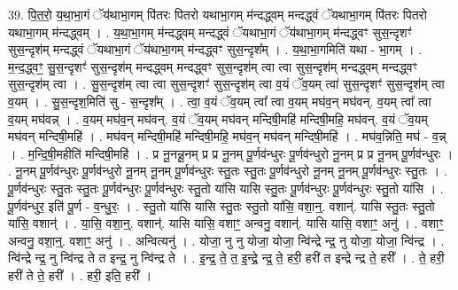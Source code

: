 \documentclass[17pt]{extarticle}
\begin{document}
39. पि॒त॒रो॒ य॒था॒भा॒गं ॅय॑थाभा॒गम् पि॑तरः पितरो यथाभा॒गम् म॑न्दद्ध्वम् मन्दद्ध्वं ॅयथाभा॒गम् पि॑तरः पितरो यथाभा॒गम् म॑न्दद्ध्वम् । . य॒था॒भा॒गम् म॑न्दद्ध्वम् मन्दद्ध्वं ॅयथाभा॒गं ॅय॑थाभा॒गम् म॑न्दद्ध्वꣳ सुस॒न्दृशꣳ॑ सुस॒न्दृश॑म् मन्दद्ध्वं ॅयथाभा॒गं ॅय॑थाभा॒गम् म॑न्दद्ध्वꣳ सुस॒न्दृश᳚म् । . य॒था॒भा॒गमिति॑ यथा - भा॒गम् । . म॒न्द॒द्ध्वꣳ॒॒ सु॒स॒न्दृशꣳ॑ सुस॒न्दृश॑म् मन्दद्ध्वम् मन्दद्ध्वꣳ सुस॒न्दृश॑म् त्वा त्वा सुस॒न्दृश॑म् मन्दद्ध्वम् मन्दद्ध्वꣳ सुस॒न्दृश॑म् त्वा । . सु॒स॒न्दृश॑म् त्वा त्वा सुस॒न्दृशꣳ॑ सुस॒न्दृश॑म् त्वा व॒यं ॅव॒यम् त्वा॑ सुस॒न्दृशꣳ॑ सुस॒न्दृश॑म् त्वा व॒यम् । . सु॒स॒न्दृश॒मिति॑ सु - स॒न्दृश᳚म् । . त्वा॒ व॒यं ॅव॒यम् त्वा᳚ त्वा व॒यम् मघ॑व॒न् मघ॑वन्. व॒यम् त्वा᳚ त्वा व॒यम् मघ॑वन्न् । . व॒यम् मघ॑व॒न् मघ॑वन्. व॒यं ॅव॒यम् मघ॑वन् मन्दिषी॒महि॑ मन्दिषी॒महि॒ मघ॑वन्. व॒यं ॅव॒यम् मघ॑वन् मन्दिषी॒महि॑ । . मघ॑वन् मन्दिषी॒महि॑ मन्दिषी॒महि॒ मघ॑व॒न् मघ॑वन् मन्दिषी॒महि॑ । . मघ॑व॒न्निति॒ मघ॑ - व॒न्न् । . म॒न्दि॒षी॒महीति॑ मन्दिषी॒महि॑ । . प्र नू॒नन्नू॒नम् प्र प्र नू॒नम् पू॒र्णव॑न्धुरः पू॒र्णव॑न्धुरो नू॒नम् प्र प्र नू॒नम् पू॒र्णव॑न्धुरः । . नू॒नम् पू॒र्णव॑न्धुरः पू॒र्णव॑न्धुरो नू॒नम् नू॒नम् पू॒र्णव॑न्धुरः स्तु॒तः स्तु॒तः पू॒र्णव॑न्धुरो नू॒नम् नू॒नम् पू॒र्णव॑न्धुरः स्तु॒तः । . पू॒र्णव॑न्धुरः स्तु॒तः स्तु॒तः पू॒र्णव॑न्धुरः पू॒र्णव॑न्धुरः स्तु॒तो या॑सि यासि स्तु॒तः पू॒र्णव॑न्धुरः पू॒र्णव॑न्धुरः स्तु॒तो या॑सि । . पू॒र्णव॑न्धुर॒ इति॑ पू॒र्ण - व॒न्धु॒रः॒ । . स्तु॒तो या॑सि यासि स्तु॒तः स्तु॒तो या॑सि॒ वशा॒न्॒. वशान्॑. यासि स्तु॒तः स्तु॒तो या॑सि॒ वशान्॑ । . या॒सि॒ वशा॒न्॒. वशान्॑. यासि यासि॒ वशाꣳ॒॒ अन्वनु॒ वशान्॑. यासि यासि॒ वशाꣳ॒॒ अनु॑ । . वशाꣳ॒॒ अन्वनु॒ वशा॒न्॒. वशाꣳ॒॒ अनु॑ । . अन्वित्यनु॑ । . योजा॒ नु नु योजा॒ योजा॒ न्वि॑न्द्रे न्द्र॒ नु योजा॒ योजा॒ न्वि॑न्द्र । . न्वि॑न्द्रे न्द्र॒ नु न्वि॑न्द्र ते त इन्द्र॒ नु न्वि॑न्द्र ते । . इ॒न्द्र॒ ते॒ त॒ इ॒न्द्रे॒ न्द्र॒ ते॒ हरी॒ हरी॑ त इन्द्रे न्द्र ते॒ हरी᳚ । . ते॒ हरी॒ हरी॑ ते ते॒ हरी᳚ । . हरी॒ इति॒ हरी᳚ । \newline
\pagebreak
{}
\end{document}
